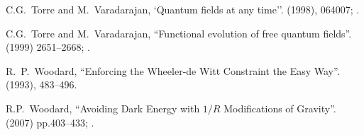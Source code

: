 \begin{thebibliography}{99}
C.G.~Torre and M.~Varadarajan,
`Quantum fields at any time''.
  (1998), 064007; .\newline
{\tt{}}

C.G.~Torre and M.~Varadarajan,
``Functional evolution of free quantum fields''.
  (1999) 2651--2668; .\newline
{\tt{}}

R.~P.~Woodard,
``Enforcing the Wheeler-de Witt Constraint the Easy Way''.
  (1993), 483--496.\\
{\tt{}}

 R.P.~Woodard,
  ``Avoiding Dark Energy with $1/R$ Modifications of Gravity''.
    (2007) pp.403--433; .\\
{\tt{}}


\end{thebibliography}
